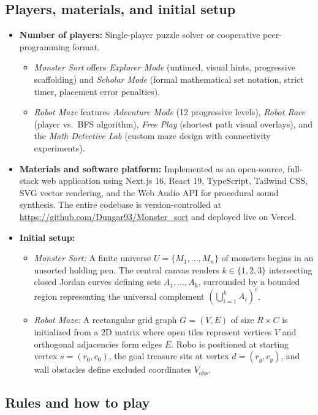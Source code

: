 \documentclass[11pt,a4paper]{article}
\begin{document}
\subsection{Players, materials, and initial setup}
\begin{itemize}
  \item \textbf{Number of players:} Single-player puzzle solver or cooperative peer-programming format.
  \begin{itemize}
    \item \textit{Monster Sort} offers \textit{Explorer Mode} (untimed, visual hints, progressive scaffolding) and \textit{Scholar Mode} (formal mathematical set notation, strict timer, placement error penalties).
    \item \textit{Robot Maze} features \textit{Adventure Mode} (12 progressive levels), \textit{Robot Race} (player vs.\ BFS algorithm), \textit{Free Play} (shortest path visual overlays), and the \textit{Math Detective Lab} (custom maze design with connectivity experiments).
  \end{itemize}
  \item \textbf{Materials and software platform:} Implemented as an open-source, full-stack web application using Next.js 16, React 19, TypeScript, Tailwind CSS, SVG vector rendering, and the Web Audio API for procedural sound synthesis. The entire codebase is version-controlled at \url{https://github.com/Dungar93/Monster_sort} and deployed live on Vercel.
  \item \textbf{Initial setup:}
  \begin{itemize}
    \item \textit{Monster Sort:} A finite universe $U = \{M_1, \dots, M_n\}$ of monsters begins in an unsorted holding pen. The central canvas renders $k \in \{1, 2, 3\}$ intersecting closed Jordan curves defining sets $A_1, \dots, A_k$, surrounded by a bounded region representing the universal complement $\left(\bigcup_{i=1}^k A_i\right)^c$.
    \item \textit{Robot Maze:} A rectangular grid graph $G = (V, E)$ of size $R \times C$ is initialized from a 2D matrix where open tiles represent vertices $V$ and orthogonal adjacencies form edges $E$. Robo is positioned at starting vertex $s = (r_0, c_0)$, the goal treasure sits at vertex $d = (r_g, c_g)$, and wall obstacles define excluded coordinates $V_{\text{obs}}$.
  \end{itemize}
\end{itemize}

\subsection{Rules and how to play}
\end{document}
